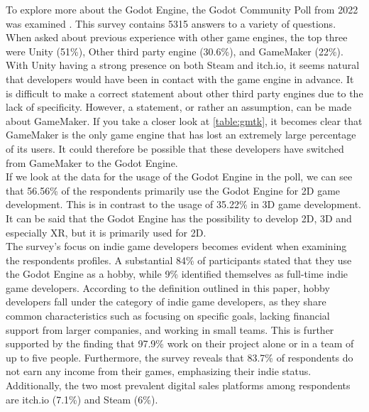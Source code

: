 To explore more about the Godot Engine, the Godot Community Poll from 2022 was examined \cite{godot-poll-results}.
This survey contains 5315 answers to a variety of questions.
When asked about previous experience with other game engines, the top three were Unity (51\%), Other third party engine (30.6\%), and GameMaker (22\%).
With Unity having a strong presence on both Steam and itch.io, it seems natural that developers would have been in contact with the game engine in advance.
It is difficult to make a correct statement about other third party engines due to the lack of specificity.
However, a statement, or rather an assumption, can be made about GameMaker.
If you take a closer look at \autoref{table:gmtk}, it becomes clear that GameMaker is the only game engine that has lost an extremely large percentage of its users.
It could therefore be possible that these developers have switched from GameMaker to the Godot Engine.\\

If we look at the data for the usage of the Godot Engine in the poll, we can see that 56.56\% of the respondents primarily use the Godot Engine for 2D game development.
This is in contrast to the usage of 35.22\% in 3D game development.
It can be said that the Godot Engine has the possibility to develop 2D, 3D and especially XR, but it is primarily used for 2D. \\

The survey's focus on indie game developers becomes evident when examining the respondents profiles.
A substantial 84\% of participants stated that they use the Godot Engine as a hobby, while 9\% identified themselves as full-time indie game developers. 
According to the definition outlined in this paper, hobby developers fall under the category of indie game developers, as they share common characteristics such as focusing on specific goals, lacking financial support from larger companies, and working in small teams. 
This is further supported by the finding that 97.9\% work on their project alone or in a team of up to five people.
Furthermore, the survey reveals that 83.7\% of respondents do not earn any income from their games, emphasizing their indie status.
Additionally, the two most prevalent digital sales platforms among respondents are itch.io (7.1\%) and Steam (6\%). \\

